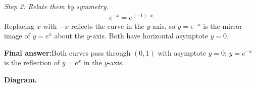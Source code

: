 \documentclass[11pt]{article}
\begin{document}
\textit{Step 2: Relate them by symmetry.}
\[\begin{gathered}
e^{-x} = e^{(-1)\cdot x}
\end{gathered}\]
Replacing \( x \) with \( -x \) reflects the curve in the \( y \)-axis, so \( y = e^{-x} \) is the mirror image of \( y = e^{x} \) about the \( y \)-axis. Both have horizontal asymptote \( y = 0 \).

\begin{answerbox}
\textbf{Final answer:}\quad Both curves pass through \(\displaystyle (0, 1)\) with asymptote \(\displaystyle  y = 0 \); \(\displaystyle  y = e^{-x} \) is the reflection of \(\displaystyle  y = e^{x} \) in the \(\displaystyle  y \)-axis.
\end{answerbox}
\textbf{Diagram.}

\begin{center}
\end{center}
\end{document}
